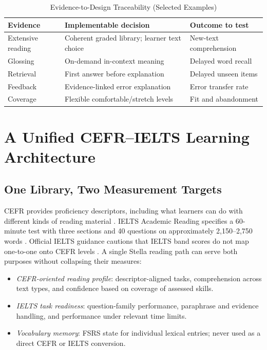 \documentclass[conference,10pt]{IEEEtran}
\begin{document}
\begin{table}[t]
\caption{Evidence-to-Design Traceability (Selected Examples)}
\label{tab:evidence}
\centering\footnotesize
\begin{tabularx}{\columnwidth}{@{}p{}X p{}@{}}
\toprule
Evidence & Implementable decision & Outcome to test\\
\midrule
Extensive reading \cite{sangers2025} & Coherent graded library; learner text choice & New-text comprehension\\
Glossing \cite{yanagisawa2020} & On-demand in-context meaning & Delayed word recall\\
Retrieval \cite{roediger2006} & First answer before explanation & Delayed unseen items\\
Feedback \cite{shute2008} & Evidence-linked error explanation & Error transfer rate\\
Coverage \cite{schmitt2011} & Flexible comfortable/stretch levels & Fit and abandonment\\
\bottomrule
\end{tabularx}
\end{table}

\section{A Unified CEFR--IELTS Learning Architecture}
\subsection{One Library, Two Measurement Targets}
CEFR provides proficiency descriptors, including what learners can do with different kinds of reading material \cite{coe2020}. IELTS Academic Reading specifies a 60-minute test with three sections and 40 questions on approximately 2,150--2,750 words \cite{ieltsformat}. Official IELTS guidance cautions that IELTS band scores do not map one-to-one onto CEFR levels \cite{ieltscefr}. A single Stella reading path can serve both purposes without collapsing their measures:
\begin{itemize}
\item \emph{CEFR-oriented reading profile}: descriptor-aligned tasks, comprehension across text types, and confidence based on coverage of assessed skills.
\item \emph{IELTS task readiness}: question-family performance, paraphrase and evidence handling, and performance under relevant time limits.
\item \emph{Vocabulary memory}: FSRS state for individual lexical entries; never used as a direct CEFR or IELTS conversion.
\end{itemize}
\end{document}
